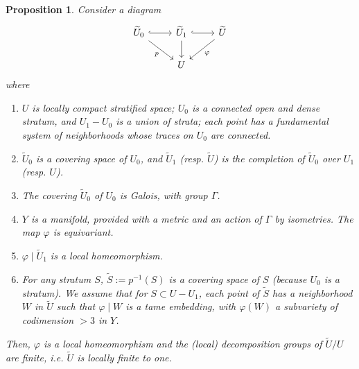 \documentclass[12pt,a4paper]{article}
\theoremstyle{plain}
\newtheorem{proposition}[theorem]{Proposition}
\theoremstyle{definition}
\theoremstyle{remark}
\begin{document}
\begin{proposition}
\label{10.16.1}
Consider a diagram
\[
\begin{tikzcd}
\widetilde{U}_0 \arrow[r, hook] \arrow[dr, "p"'] & \widetilde{U}_1 \arrow[r, hook] \arrow[d] & \widetilde{U} \arrow[dl, "\varphi"] \\
& U &
\end{tikzcd}
\]
where
\begin{enumerate}
\item[a)] $U$ is locally compact stratified space; $U_0$ is a connected open and dense stratum, and $U_1 - U_0$ is a union of strata; each point has a fundamental system of neighborhoods whose traces on $U_0$ are connected.
\item[b)] $\widetilde{U}_0$ is a covering space of $U_0$, and $\widetilde{U}_1$ (resp. $\widetilde{U}$) is the completion of $\widetilde{U}_0$ over $U_1$ (resp. $U$).
\item[c)] The covering $\widetilde{U}_0$ of $U_0$ is Galois, with group $\Gamma$.
\item[d)] $Y$ is a manifold, provided with a metric and an action of $\Gamma$ by isometries. The map $\varphi$ is equivariant.
\item[e)] $\varphi \mid \widetilde{U}_1$ is a local homeomorphism.
\item[f)] For any stratum $S$, $\widetilde{S} := p^{-1}(S)$ is a covering space of $S$ (because $U_0$ is a stratum). We assume that for $S \subset U - U_1$, each point of $\widetilde{S}$ has a neighborhood $W$ in $\widetilde{U}$ such that $\varphi \mid W$ is a tame embedding, with $\varphi(W)$ a subvariety of codimension $> 3$ in $Y$.
\end{enumerate}
Then, $\varphi$ is a local homeomorphism and the (local) decomposition groups of $\widetilde{U}/U$ are finite, i.e. $\widetilde{U}$ is locally finite to one.
\end{proposition}
\end{document}
